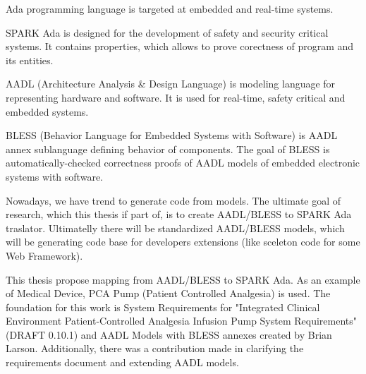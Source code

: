 
\pagestyle{empty}
\setlength{\baselineskip}{0.8cm}




Ada programming language is targeted at embedded and real-time systems.

SPARK Ada is designed for the development of safety and security critical systems. It contains properties, which allows to prove corectness of program and its entities.

AADL (Architecture Analysis \& Design Language) is modeling language for representing hardware and software. It is used for real-time, safety critical and embedded systems.

BLESS (Behavior Language for Embedded Systems with Software) is AADL annex sublanguage defining behavior of components. The goal of BLESS is automatically-checked correctness proofs of AADL models of embedded electronic systems with software.

Nowadays, we have trend to generate code from models. The ultimate goal of research, which this thesis if part of, is to create AADL/BLESS to SPARK Ada traslator. Ultimatelly there will be standardized AADL/BLESS models, which will be generating code base for developers extensions (like sceleton code for some Web Framework).

This thesis propose mapping from AADL/BLESS to SPARK Ada. As an example of Medical Device, PCA Pump (Patient Controlled Analgesia) is used. The foundation for this work is System Requirements for "Integrated Clinical Environment Patient-Controlled Analgesia Infusion Pump System Requirements" (DRAFT 0.10.1) \cite{PcaReq} and AADL Models with BLESS annexes created by Brian Larson. Additionally, there was a contribution made in clarifying the requirements document and extending AADL models.
